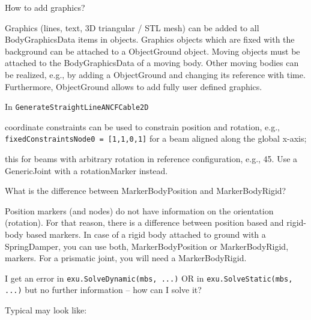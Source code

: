 \ei
\item How to add graphics?
\bi
\item[$\ra$] Graphics (lines, text, 3D triangular / STL mesh) can be added to all BodyGraphicsData items in objects. Graphics objects which are fixed with the background can be attached to a ObjectGround object. Moving objects must be attached to the BodyGraphicsData of a moving body. Other moving bodies can be realized, e.g., by adding a ObjectGround and changing its reference with time. Furthermore, ObjectGround allows to add fully user defined graphics.
\ei
\item In \texttt{GenerateStraightLineANCFCable2D} 
\bi
\item[$\ra$] coordinate constraints can be used to constrain position and rotation, e.g., \texttt{fixedConstraintsNode0 = [1,1,0,1]} for a beam aligned along the global x-axis; 
\item[$\ra$] this  for beams with arbitrary rotation in reference configuration, e.g., 45\textdegree. Use a GenericJoint with a rotationMarker instead.
\ei
\item What is the difference between MarkerBodyPosition and MarkerBodyRigid?
\bi
\item[$\ra$] Position markers (and nodes) do not have information on the orientation (rotation). For that reason, there is a difference between position based and rigid-body based markers. In case of a rigid body attached to ground with a SpringDamper, you can use both, MarkerBodyPosition or MarkerBodyRigid, markers. For a prismatic joint, you will need a MarkerBodyRigid.
\ei
\item I get an error in \texttt{exu.SolveDynamic(mbs, ...)} OR in \texttt{exu.SolveStatic(mbs, ...)} but no further information -- how can I solve it?
\bi
\item[$\ra$] Typical  may look like:
